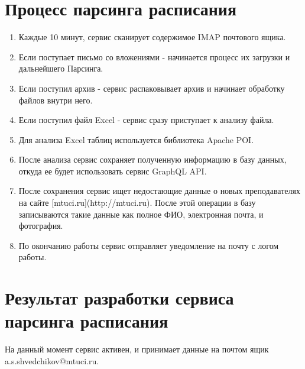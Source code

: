\section{Процесс парсинга расписания}
\begin{enumerate}
\item Каждые 10 минут, сервис сканирует содержимое IMAP почтового ящика.
\item Если поступает письмо со вложениями - начинается процесс их загрузки и дальнейшего Парсинга.
\item Если поступил архив - сервис распаковывает архив и начинает обработку файлов внутри него.
\item Если поступил файл Excel - сервис сразу приступает к анализу файла.
\item Для анализа Excel таблиц используется библиотека Apache POI.
\item После анализа сервис сохраняет полученную информацию в базу данных, откуда ее будет использовать сервис GraphQL API.
\item После сохранения сервис ищет недостающие данные о новых преподавателях на сайте 
[mtuci.ru](http://mtuci.ru). После этой операции в базу записываются такие данные как полное ФИО, 
электронная почта, и фотография.
\item По окончанию работы сервис отправляет уведомление на почту с логом работы.
\end{enumerate}

\section{Результат разработки сервиса парсинга расписания}
На данный момент сервис активен, и принимает данные на почтом ящик a.s.shvedchikov@mtuci.ru.